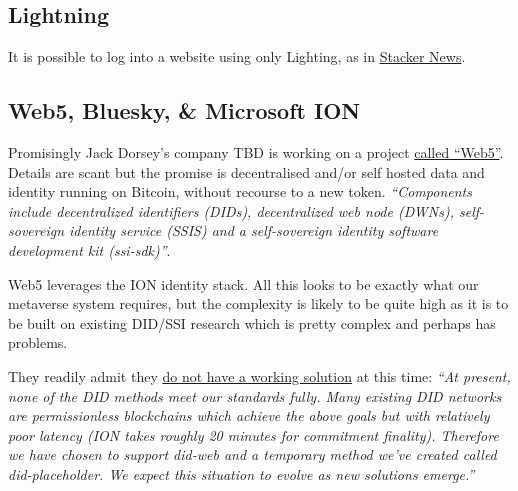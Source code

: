 \subsection{Lightning}
It is possible to log into a website using only Lighting, as in \href{https://stacker.news/login?callbackUrl=https://stacker.news/}{Stacker News}. 
\subsection{Web5, Bluesky, \& Microsoft ION}
Promisingly Jack Dorsey's company TBD is working on a project \href{https://developer.tbd.website/projects/web5/}{called ``Web5''}. Details are scant but the promise is decentralised and/or self hosted data and identity running on Bitcoin, without recourse to a new token. \textit{``Components include decentralized identifiers (DIDs), decentralized web node (DWNs), self-sovereign identity service (SSIS) and a self-sovereign identity software development kit (ssi-sdk)''}.\par
Web5 leverages the ION identity stack. All this looks to be exactly what our metaverse system requires, but the complexity is likely to be quite high as it is to be built on existing DID/SSI research which is pretty complex and perhaps has problems.\par 
They readily admit they \href{https://atproto.com/guides/identity}{do not have a working solution} at this time: \textit{``At present, none of the DID methods meet our standards fully. Many existing DID networks are permissionless blockchains which achieve the above goals but with relatively poor latency (ION takes roughly 20 minutes for commitment finality). Therefore we have chosen to support did-web and a temporary method we've created called did-placeholder. We expect this situation to evolve as new solutions emerge.''}
